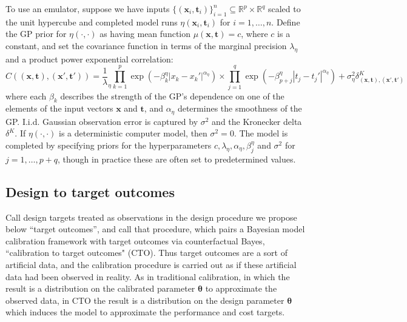 \documentclass[12pt]{article}
\begin{document}
%
To use an emulator, suppose we have inputs $\{(\mathbf x_i,\mathbf t_i)\}_{i=1}^n\subseteq \mathbb R^p\times \mathbb R^q$ scaled to the 
unit hypercube and completed model runs 
%
$\eta\left(\mathbf x_i,\mathbf t_i\right)$ for $i=1,\ldots,n.$
%
Define the GP prior for $\eta(\cdot,\cdot)$ as having mean function $\mu(\mathbf x,\mathbf t)=c$, where $c$ is a constant, and
%
set the covariance function in terms of the marginal precision $\lambda_\eta$ and a product power exponential correlation:
%
\begin{equation}\label{eq:Hig_cov}
C((\mathbf x,\mathbf t),(\mathbf x',\mathbf t')) = \frac 1\lambda_\eta \prod_{k=1}^{p}
\exp \left(-\beta^\eta_k|x_k-x_k'|^{\alpha_\eta}\right) \times
\prod_{j=1}^{q}
\exp \left(-\beta^\eta_{p+j}|t_j-t_j'|^{\alpha_\eta}\right) +
\sigma^2_\eta \delta_{(\mathbf x,\mathbf t),(\mathbf x',\mathbf t')}^K
\end{equation}
%
where each $\beta_k$ describes the strength of the GP's dependence on one of the elements of the input vectors $\mathbf x$ and $\mathbf t$, and $\alpha_\eta$ determines the smoothness of the GP. 
%
I.i.d. Gaussian observation error is captured by $\sigma^2$ and the Kronecker delta $\delta^K$.
%
If $\eta(\cdot,\cdot)$ is a deterministic computer model, then $\sigma^2=0$.
%
The model is completed by specifying priors for the hyperparameters $c,\lambda_\eta,\alpha_\eta,\beta^\eta_j$ and $\sigma^2$ for $j=1,\ldots,p+q$, though in practice these are often set to predetermined values.
%

%
\subsection{Design to target outcomes}
%

%
Call design targets treated as observations in the design procedure we propose below ``target outcomes'', and call that procedure, which pairs a Bayesian model calibration framework with target outcomes via counterfactual Bayes, ``calibration to target outcomes" (CTO). 
%
Thus target outcomes are a sort of artificial data, and the calibration procedure is carried out as if these artificial data had been observed in reality.
%
As in traditional calibration, in which the result is a distribution on the calibrated parameter $\boldsymbol\theta$ to approximate the observed data, in CTO the result is a distribution on the design parameter $\boldsymbol\theta$ which induces the model to approximate the performance and cost targets.
%
%
%
%
%
\end{document}
